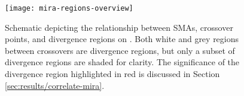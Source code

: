 \begin{figure}
    \centering
    \texttt{[image: mira-regions-overview]}
    \vspace{-.15in}
    \caption{Schematic depicting the relationship between SMAs, crossover points, and divergence regions on \mira.
    Both white and grey regions between crossovers are divergence regions, but only a subset of divergence regions are shaded for clarity.
    The significance of the divergence region highlighted in red is discussed in Section \ref{sec:results/correlate-mira}.}
    \label{fig:mira-regions-overview}
\end{figure}
